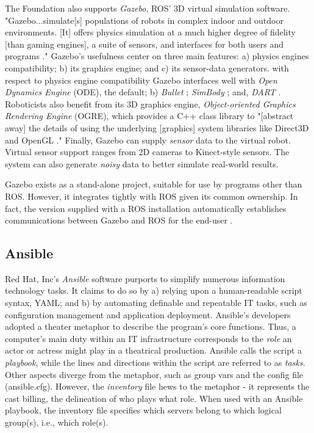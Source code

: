 \documentclass[9pt,twocolumn,twoside]{../../styles/osajnl}
\begin{document}
The Foundation also supports \textit{Gazebo}, ROS' 3D virtual simulation software.  "Gazebo...simulate[s] populations of robots in complex indoor and outdoor environments. [It] offers physics simulation at a much higher degree of fidelity [than gaming engines], a suite of sensors, and interfaces for both users and programs \cite{www-gazebo-overview}."  Gazebo's usefulness center on three main features: a) physics engines compatibility; b) its graphics engine; and c) its sensor-data generators.  with respect to physics engine compatibility Gazebo interfaces well with \textit{Open Dynamics Engine} \cite{www-ode-homepage} (ODE), the default; b) \textit{Bullet} \cite{www-bullet-homepage}; \textit{SimBody} \cite{www-simbody-homepage}; and, \textit{DART} \cite{www-dart-homepage}. Roboticists also benefit from its 3D graphics engine, \textit{Object-oriented Graphics Rendering Engine} \cite{www-ogre-homepage} (OGRE), which provides a C++ class library to "[abstract away] the details of using the underlying [graphics] system libraries like Direct3D and OpenGL \cite{www-ogre-about}."  Finally, Gazebo can supply \textit{sensor} data to the virtual robot.  Virtual sensor support ranges from 2D cameras to Kinect-style sensors.  The system can also generate \textit{noisy} data to better simulate real-world results.

Gazebo exists as a stand-alone project, suitable for use by programs other than ROS.  However, it integrates tightly with ROS given its common ownership.  In fact, the version supplied with a ROS installation automatically establishes communications between Gazebo and ROS for the end-user \cite{www-gazebo-ros}.  

\subsection{Ansible}

Red Hat, Inc's \cite{www-redhat} \textit{Ansible} software purports to simplify numerous information technology tasks.  It claims to do so by a) relying upon a human-readable script syntax, YAML; and b) by automating definable and repeatable IT tasks, such as configuration management and application deployment.  Ansible's developers adopted a theater metaphor to describe the program's core functions.  Thus, a computer's main duty within an IT infrastructure corresponds to the \textit{role} an actor or actress might play in a theatrical production.  Ansible calls the script a \textit{playbook}, while the lines and directions within the script are referred to as \textit{tasks}.  Other aspects diverge from the metaphor, such as group vars and the config file (ansible.cfg).  However, the \textit{inventory} file hews to the metaphor - it represents the cast billing, the delineation of who plays what role.  When used with an Ansible playbook, the inventory file specifies which servers belong to which logical group(s), i.e., which role(s). 
\end{document}
